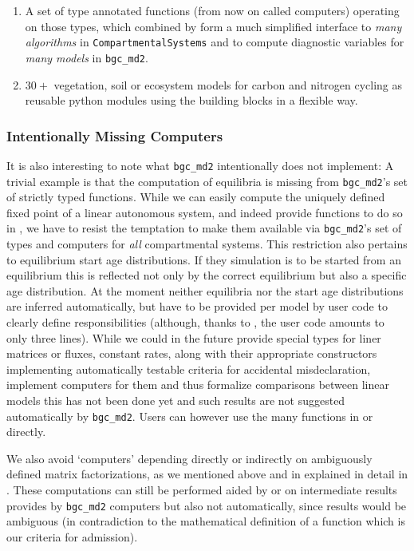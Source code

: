 \begin{enumerate}
\begin{figure}[h]
      \label{fig:subsystems}
      \end{figure}
      
    \item
      A set of type annotated functions (from now on called computers) operating on those types,  which combined
      by \ComputabilityGraphs form a much simplified 
      interface to \emph{many  algorithms} in \texttt{CompartmentalSystems} and \LAPM to compute diagnostic variables
      for \emph{many models} in \texttt{bgc\_md2}.
    \item
    $30+$ vegetation, soil or ecosystem models for carbon and nitrogen cycling
      as reusable python modules using the building blocks in a flexible way. 
  \end{enumerate}

\subsubsection{Intentionally Missing Computers}
It is also interesting to note what \texttt{bgc\_md2} intentionally does not implement:
A trivial example is that the computation of equilibria is missing from \texttt{bgc\_md2}'s set of strictly typed functions. 
While we can easily compute the uniquely defined fixed point of a linear
autonomous system, and indeed provide functions to do so in \LAPM, we have to
resist the temptation to make them available via \texttt{bgc\_md2}'s set of
types and computers for \emph{all} compartmental systems. 
This restriction also pertains to equilibrium start age distributions. 
If they simulation is to be started from an equilibrium this is reflected not only by the correct equilibrium
but also a specific age distribution.  
At the moment neither equilibria nor the start age distributions 
are inferred automatically, but have to be provided per model by 
user code to clearly define responsibilities (although, thanks to \LAPM, the user code amounts to only three lines).
While we could in the future provide special types for liner matrices or
fluxes, constant rates, along with their appropriate constructors implementing
automatically testable criteria for accidental misdeclaration, implement
computers for them and thus formalize comparisons between linear models
this has not been done yet and such results are not suggested automatically by \texttt{bgc\_md2}.
Users can however use the many functions in \LAPM or \CompartmentalSystems directly.

We also avoid `computers' depending directly or indirectly on ambiguously defined matrix factorizations, 
as we mentioned above and in explained in detail in . 
These computations can still be performed aided by  \LAPM or \CompartmentalSystems on intermediate results
provides by \texttt{bgc\_md2} computers but also not automatically, since results would be ambiguous (in contradiction to the mathematical definition of a function which is our criteria  for admission). 


